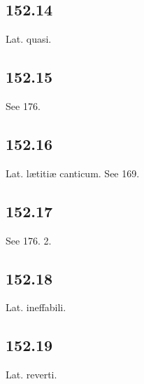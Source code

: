 \subsection*{152.14}

Lat. quasi.

\subsection*{152.15}

See 176.

\subsection*{152.16}

Lat. lætitiæ canticum. See 169.

\subsection*{152.17}

See 176. 2.

\subsection*{152.18}

Lat. ineffabili.

\subsection*{152.19}

Lat. reverti.

